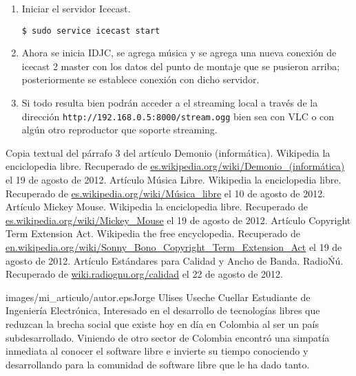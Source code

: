\begin{multicols}{2}
\begin{enumerate}
\item Iniciar el servidor Icecast.

\begin{lstlisting}
$ sudo service icecast start
\end{lstlisting}

\item Ahora se inicia IDJC, se agrega música y se agrega una nueva conexión de icecast 2 master con los datos del punto de montaje que se pusieron arriba; posteriormente se establece conexión con dicho servidor.

\item Si todo resulta bien podrán acceder a el streaming local a través de la dirección \verb!http://192.168.0.5:8000/stream.ogg! bien sea con VLC o con algún otro reproductor que soporte streaming.

\end{enumerate}


\begin{bibliografia}
Copia textual del párrafo 3 del artículo Demonio (informática). Wikipedia la enciclopedia libre.
Recuperado de \url{es.wikipedia.org/wiki/Demonio_(informática)} el 19 de agosto de 2012.
Artículo Música Libre. Wikipedia la enciclopedia libre.
Recuperado de \url{es.wikipedia.org/wiki/Música_libre} el 10 de agosto de 2012.
Artículo Mickey Mouse. Wikipedia la enciclopedia libre.
Recuperado de \url{es.wikipedia.org/wiki/Mickey_Mouse} el 19 de agosto de 2012.
Artículo Copyright Term Extension Act. Wikipedia the free encyclopedia.
Recuperado de \url{en.wikipedia.org/wiki/Sonny_Bono_Copyright_Term_Extension_Act} el 19 de agosto de 2012.
Artículo Estándares para Calidad y Ancho de Banda. RadioŃú.
Recuperado de \url{wiki.radiognu.org/calidad} el 22 de agosto de 2012.
\end{bibliografia}


\begin{biografia}{images/mi_articulo/autor.eps}{Jorge Ulises Useche Cuellar} Estudiante de Ingeniería Electrónica, Interesado en el desarrollo de tecnologías libres que reduzcan la brecha social que existe hoy en día en Colombia al ser un país subdesarrollado. Viniendo de otro sector de Colombia encontró una simpatía inmediata al conocer el software libre e invierte su tiempo conociendo y desarrollando para la comunidad de software libre que le ha dado tanto.
\end{biografia}

\end{multicols} %



\clearpage
\pagebreak
